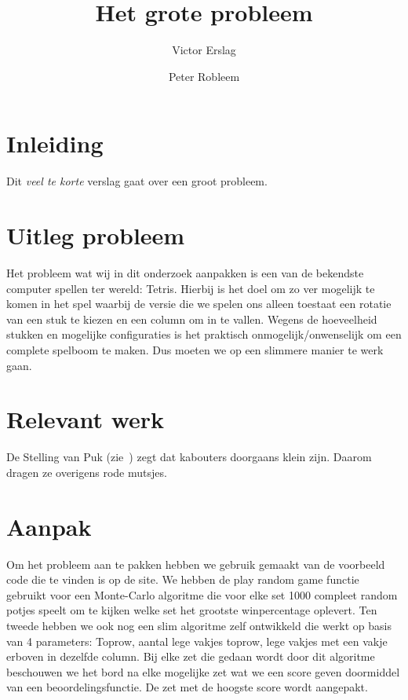 \documentclass[10pt]{article}
\author{Victor Erslag \and Peter Robleem}
\title{Het grote probleem}
\begin{document}

\maketitle

\section{Inleiding} 

Dit \emph{veel te korte} verslag gaat over een groot probleem.

\section{Uitleg probleem}

Het probleem wat wij in dit onderzoek aanpakken is een van de bekendste computer spellen ter wereld: Tetris. Hierbij is het doel om zo ver mogelijk te komen in het spel waarbij de versie die we spelen ons alleen toestaat een rotatie van een stuk te kiezen en een column om in te vallen. Wegens de hoeveelheid stukken en mogelijke configuraties is het praktisch onmogelijk/onwenselijk om een complete spelboom te maken. Dus moeten we op een slimmere manier te werk gaan.

\section{Relevant werk}

De Stelling van Puk (zie~\cite{pukkie}) zegt dat 
kabouters doorgaans klein zijn. Daarom dragen ze overigens rode mutsjes.

\section{Aanpak}

Om het probleem aan te pakken hebben we gebruik gemaakt van de voorbeeld code die te vinden is op de site. We hebben de play random game functie gebruikt voor een Monte-Carlo algoritme die voor elke set 1000 compleet random potjes speelt om te kijken welke set het grootste winpercentage oplevert. Ten tweede hebben we ook nog een slim algoritme zelf ontwikkeld die werkt op basis van 4 parameters: Toprow, aantal lege vakjes toprow, lege vakjes met een vakje erboven in dezelfde column. Bij elke zet die gedaan wordt door dit algoritme beschouwen we het bord na elke mogelijke zet wat we een score geven doormiddel van een beoordelingsfunctie. De zet met de hoogste score wordt aangepakt. 
\end{document}
